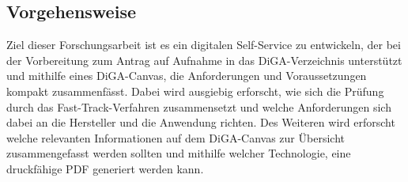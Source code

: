 \subsection{Vorgehensweise}
Ziel dieser Forschungsarbeit ist es ein digitalen Self-Service zu entwickeln, der bei der Vorbereitung zum Antrag auf Aufnahme in das DiGA-Verzeichnis unterstützt und mithilfe eines DiGA-Canvas, die Anforderungen und Voraussetzungen kompakt zusammenfässt. Dabei wird ausgiebig erforscht, wie sich die Prüfung durch das Fast-Track-Verfahren zusammensetzt und welche Anforderungen sich dabei an die Hersteller und die Anwendung richten. Des Weiteren wird erforscht welche relevanten Informationen auf dem DiGA-Canvas zur Übersicht zusammengefasst werden sollten und mithilfe welcher Technologie, eine druckfähige PDF generiert werden kann.